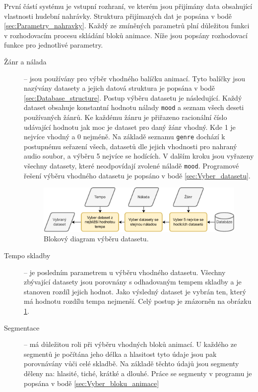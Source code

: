 První částí systému je vstupní rozhraní, ve kterém jsou přijímány data obsahující vlastnosti hudební nahrávky. Struktura přijímaných dat je popsána v bodě \ref{sec:Parametry_nahravky}. Každý ze zmíněných parametrů plní důležitou funkci v rozhodovacím procesu skládání bloků animace. Níže jsou popsány rozhodovací funkce pro jednotlivé parametry.

\begin{description}
    \item[Žánr a nálada] -- jsou používány pro výběr vhodného balíčku animací. Tyto balíčky jsou nazývány datasety a jejich datová struktura je popsána v bodě \ref{sec:Database_structure}. Postup výběru datasetu je následující. Každý dataset obsahuje konstantní hodnotu nálady \texttt{mood} a seznam všech deseti používaných žánrů. Ke každému žánru je přiřazeno racionální číslo udávající hodnotu jak moc je dataset pro daný žánr vhodný. Kde 1 je nejvíce vhodný a 0 nejméně. Na základě seznamu \texttt{genre} dochází k postupnému seřazení všech, datasetů dle jejich vhodnosti pro nahraný audio soubor, a výběru 5 nejvíce se hodících. V dalším kroku jsou vyřazeny všechny datasety, které neodpovídají zvolené náladě \texttt{mood}. Programové řešení výběru vhodného datasetu je popsáno v bodě \ref{sec:Vyber_datasetu}.
    
    \begin{figure}[H]
        \centering
        \includegraphics[width = 1\linewidth]{obrazky/Dataset_selection_diagram.pdf}
        \caption{Blokový diagram výběru datasetu.}
        \label{fig:Dataset_selection_diagram}
    \end{figure}

    \item[Tempo skladby] -- je posledním parametrem u výběru vhodného datasetu. Všechny zbývající datasety jsou porovnány s odhadovaným tempem skladby a je stanoven rozdíl jejich hodnot. Jako výsledný dataset je vybrán ten, který má hodnotu rozdílu tempa nejmenší. Celý postup je znázorněn na obrázku \ref{fig:Dataset_selection_diagram}.
    
    \item[Segmentace] -- má důležitou roli při výběru vhodných bloků animací. U každého ze segmentů je počítána jeho délka a hlasitost tyto údaje jsou pak porovnávány vůči celé skladbě. Na základě těchto údajů jsou segmenty děleny na: hlasité, tiché, krátké a dlouhé. Práce se segmenty v programu je popsána v bodě \ref{sec:Vyber_bloku_animace}


\end{description}
